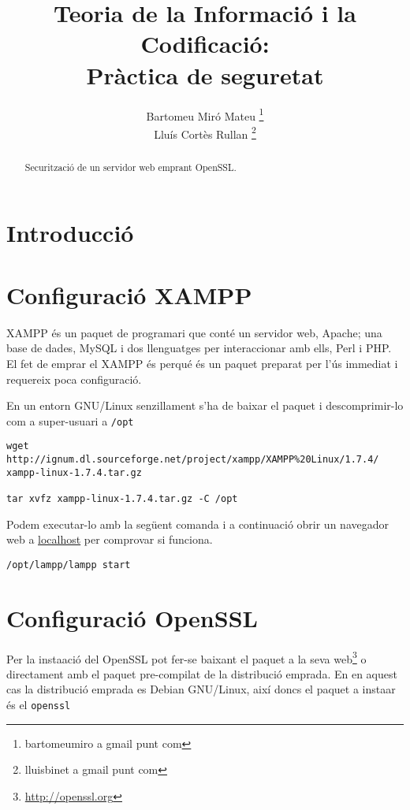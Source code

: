 \documentclass[a4paper,11pt]{scrartcl}
\title{Teoria de la Informació i la Codificació: \\ Pràctica de seguretat}
\author{ Bartomeu Miró Mateu \thanks{bartomeumiro a gmail punt com} \\
	 Lluís Cortès Rullan \thanks{lluisbinet a gmail punt com} }
\begin{document}
  \maketitle

  \begin{abstract}
    Securització de un servidor web emprant OpenSSL.
  \end{abstract}

  \newpage

\section{Introducció}



\section{Configuració XAMPP}
XAMPP és un paquet de programari que conté un servidor web, Apache; una base 
de dades, MySQL i dos llenguatges per interaccionar amb ells, Perl i PHP. El
fet de emprar el XAMPP és perqué és un paquet preparat per l'ús immediat i
requereix poca configuració.

En un entorn GNU/Linux senzillament s'ha de baixar el paquet i descomprimir-lo
com a super-usuari a \texttt{/opt}

\begin{verbatim}
wget http://ignum.dl.sourceforge.net/project/xampp/XAMPP%20Linux/1.7.4/
xampp-linux-1.7.4.tar.gz

tar xvfz xampp-linux-1.7.4.tar.gz -C /opt
\end{verbatim}

Podem executar-lo amb la següent comanda i a continuació obrir un navegador
web a \href{http://localhost}{localhost} per comprovar si funciona.

\begin{verbatim}
/opt/lampp/lampp start
\end{verbatim}

\section{Configuració OpenSSL}
Per la insta\lgem ació del OpenSSL pot fer-se baixant el paquet a la seva
web\footnote{\url{http://openssl.org}} o directament amb el paquet pre-compilat
de la distribució emprada. En en aquest cas la distribució emprada es Debian 
GNU/Linux, així doncs el paquet a insta\lgem ar és el \texttt{openssl}
\end{document}
